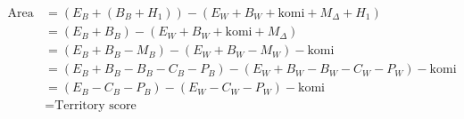 \documentclass[11pt]{article}
\begin{document}
\begin{align}
\text{Area score} &= (E_B + (B_B+H_1)) - (E_W + B_W + \text{komi} + M_\Delta + H_1) \\
&= (E_B + B_B) - (E_W + B_W + \text{komi} + M_\Delta) \\
&= (E_B + B_B - M_B) - (E_W + B_W - M_W) - \text{komi} \\
&= (E_B + B_B - B_B - C_B - P_B ) - (E_W + B_W - B_W - C_W - P_W) - \text{komi} \\
&= (E_B - C_B - P_B) - (E_W - C_W - P_W) - \text{komi} \\
&= \text{Territory score}
\end{align}
\end{document}
